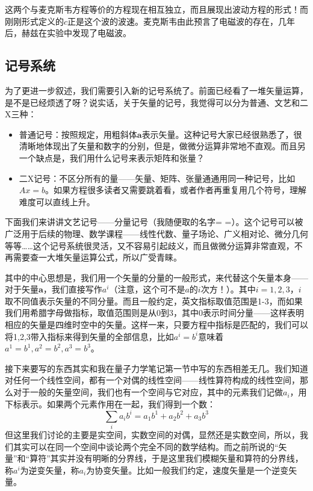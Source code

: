 \documentclass{ctexart}
\begin{document}
这两个与麦克斯韦方程等价的方程现在相互独立，而且展现出波动方程的形式！而刚刚形式定义的$c$正是这个波的波速。麦克斯韦由此预言了电磁波的存在，几年后，赫兹在实验中发现了电磁波。

\subsection{记号系统}
为了更进一步叙述，我们需要引入新的记号系统了。前面已经看了一堆矢量运算，是不是已经烦透了呀？说实话，关于矢量的记号，我觉得可以分为普通、文艺和二X三种：

\begin{itemize}
\item 普通记号：按照规定，用粗斜体$\bm{a}$表示矢量。这种记号大家已经很熟悉了，很清晰地体现出了矢量和数字的分别，但是，做微分运算非常地不直观。而且另一个缺点是，我们用什么记号来表示矩阵和张量？
\item 二X记号：不区分所有的量——矢量、矩阵、张量通通用同一种记号，比如$Ax=b$。如果方程很多读者又需要跳着看，或者作者再重复用几个符号，理解难度可以直线上升。
\end{itemize}
下面我们来讲讲文艺记号——分量记号（我随便取的名字= =）。这个记号可以被广泛用于后续的物理、数学课程——线性代数、量子场论、广义相对论、微分几何等等……这个记号系统很灵活，又不容易引起歧义，而且做微分运算非常直观，不再需要查一大堆矢量运算公式，所以广受青睐。

其中的中心思想是，我们用一个矢量的分量的一般形式，来代替这个矢量本身——对于矢量$\bm{a}$，我们直接写作$a^i$（注意，这个可不是$a$的$i$次方！）。其中$i=1,2,3$，$i$取不同值表示矢量的不同分量。而且一般约定，英文指标取值范围是1-3，而如果我们用希腊字母做指标，取值范围则是从0到3，其中0表示时间分量——这样表明相应的矢量是四维时空中的矢量。这样一来，只要方程中指标是匹配的，我们可以将1,2,3带入指标来得到矢量的全部信息，比如$a^i=b^i$意味着$a^1=b^1,a^2=b^2,a^3=b^3$。

接下来要写的东西其实和我在量子力学笔记第一节中写的东西相差无几。我们知道对任何一个线性空间，都有一个对偶的线性空间——线性算符构成的线性空间，那么对于一般的矢量空间，我们也有一个空间与它对应，其中的元素我们记做$a_i$，用下标表示。如果两个元素作用在一起，我们得到一个数：
\begin{equation}
\sum_ia_ib^i=a_1b^1+a_2b^2+a_3b^3
\end{equation}
但这里我们讨论的主要是实空间，实数空间的对偶，显然还是实数空间，所以，我们其实可以在同一个空间中谈论两个完全不同的数学结构。而之前所说的“矢量”和“算符”其实并没有明晰的分界线，于是这里我们模糊矢量和算符的分界线，称$a^i$为逆变矢量，称$a_i$为协变矢量。比如一般我们约定，速度矢量是一个逆变矢量。
\end{document}
